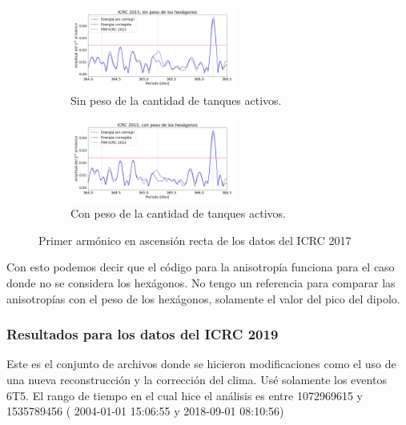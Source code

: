 				\begin{figure}[H]
				
					\begin{subfigure}[b]{\textwidth}
					\centering
						\includegraphics[width=0.6\textwidth]{ICRC/ICRC2017_Ecor_Eraw.png}
						\caption{Sin peso de la cantidad de tanques activos. } 	\label{fig:8EeV_sin_peso_ICRC2017_raw}
					\end{subfigure}%
				
					\begin{subfigure}[b]{\textwidth}
					\centering
						\includegraphics[width=0.6\textwidth]{ICRC/ICRC2017_Ecor_Eraw_hex.png}
						\caption{Con peso de la cantidad de tanques activos. } 	\label{fig:8EeV_sin_peso_ICRC2017_cor}
					\end{subfigure}
					\caption{Primer armónico en ascensión recta de los datos del ICRC 2017}
				\end{figure}

			Con esto podemos decir que el código para la anisotropía funciona para el caso donde no se considera los hexágonos. No tengo un referencia para comparar las anisotropías con el peso de los hexágonos, solamente el valor del pico del dipolo.

			\subsubsection{Resultados para los datos del ICRC 2019}
			
			Este es el conjunto de archivos donde se hicieron modificaciones como el uso de una nueva reconstrucción y la corrección del clima. Usé solamente los eventos 6T5. El rango de tiempo en el cual hice  el análisis es entre 1072969615 y 1535789456 (	2004-01-01 15:06:55 y 	2018-09-01 08:10:56)

